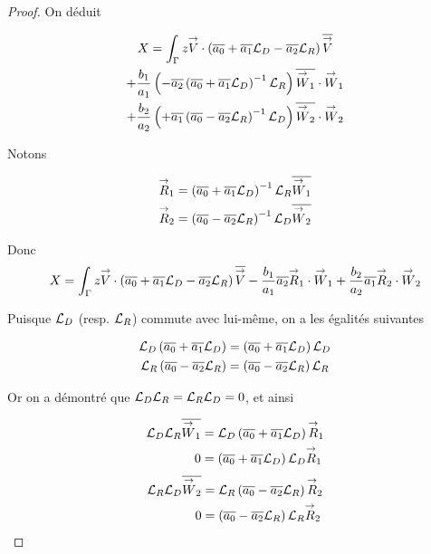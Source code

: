 \begin{proof}
    On déduit

    \begin{multline*}
      X = \int_\Gamma z {\overset{\rightarrow}{V}} \cdot \left({\overline{a_0}}  + {\overline{a_1}} {\mathcal{L}_D} - {\overline{a_2}}{\mathcal{L}_R}\right){\overline{{\overset{\rightarrow}{V}}}}
      \\
      + \dfrac{b_1}{a_1} \left( - {\overline{a_2}} \left( {\overline{a_0}} + {\overline{a_1}}{\mathcal{L}_D}\right)^{-1}{\mathcal{L}_R}\right){\overline{{\overset{\rightarrow}{W}}_1}}\cdot{\overset{\rightarrow}{W}}_1
      \\
      + \dfrac{b_2}{a_2} \left( + {\overline{a_1}} \left( {\overline{a_0}} - {\overline{a_2}}{\mathcal{L}_R}\right)^{-1}{\mathcal{L}_D}\right){\overline{{\overset{\rightarrow}{W}}_2}}\cdot{\overset{\rightarrow}{W}}_2
    \end{multline*}

    Notons

    \newcommand{\vR}{\vect{R}}

    \begin{align*}
      \vR_1 & = \left(\conj{a_0}  + \conj{a_1} \LD \right)^{-1}\LR \conj{\vW_1}
      \\
      \vR_2 & = \left(\conj{a_0}  - \conj{a_2} \LR \right)^{-1}\LD \conj{\vW_2}
    \end{align*}

    Donc 
    \begin{equation*}
      X = \int_\Gamma z \vV \cdot \left(\conj{a_0}  + \conj{a_1} \LD - \conj{a_2}\LR\right)\conj{\vV} - \frac{b_1}{a_1}\conj{a_2}\vR_1\cdot\vW_1 + \frac{b_2}{a_2}\conj{a_1}\vR_2\cdot\vW_2
    \end{equation*}

    Puisque \({\mathcal{L}_D}\) (resp. \({\mathcal{L}_R}\)) commute avec lui-même, on a les égalités suivantes

    \begin{align*}
      {\mathcal{L}_D}\left({\overline{a_0}}  + {\overline{a_1}} {\mathcal{L}_D} \right)&=\left({\overline{a_0}}  + {\overline{a_1}} {\mathcal{L}_D} \right){\mathcal{L}_D}
      \\
      {\mathcal{L}_R}\left({\overline{a_0}}  - {\overline{a_2}} {\mathcal{L}_R} \right)&=\left({\overline{a_0}}  - {\overline{a_2}} {\mathcal{L}_R} \right){\mathcal{L}_R}
    \end{align*}

    Or on a démontré que \({\mathcal{L}_D}{\mathcal{L}_R}={\mathcal{L}_R}{\mathcal{L}_D}=0\), et ainsi

    \begin{equation*}
      \begin{aligned}
        \LD\LR\conj{\vW_1} &= \LD\left(\conj{a_0}  + \conj{a_1} \LD \right)\vR_1
        \\
        0 & =\left(\conj{a_0}  + \conj{a_1} \LD \right)\LD\vR_1
      \end{aligned}
    \end{equation*}
    \begin{equation*}
      \begin{aligned}
        \LR\LD\conj{\vW_2} &= \LR\left(\conj{a_0}  - \conj{a_2} \LR \right)\vR_2
        \\
        0 & =\left(\conj{a_0}  - \conj{a_2} \LR \right)\LR\vR_2
      \end{aligned}
    \end{equation*}


\end{proof}
